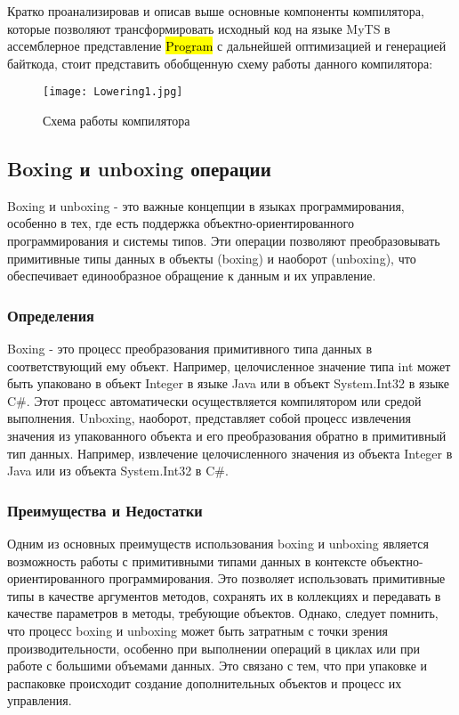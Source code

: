 Кратко проанализировав и описав выше основные компоненты компилятора, которые позволяют трансформировать исходный код на
языке MyTS в ассемблерное представление \hl{Program} с дальнейшей оптимизацией и генерацией байткода,
стоит представить обобщенную схему работы данного компилятора:

\begin{figure}[h]
    \centering
    \texttt{[image: Lowering1.jpg]}
    \caption{Схема работы компилятора}\label{fig:figure}
\end{figure}

\subsection{Boxing и unboxing операции}

Boxing и unboxing - это важные концепции в языках программирования, особенно в тех, где есть поддержка
объектно-ориентированного программирования и системы типов.
Эти операции позволяют преобразовывать примитивные типы данных в объекты (boxing) и наоборот (unboxing), что
обеспечивает единообразное обращение к данным и их управление.

\subsubsection{Определения}

Boxing - это процесс преобразования примитивного типа данных в соответствующий ему объект.
Например, целочисленное значение типа int может быть упаковано в объект Integer в языке Java или в объект
System.Int32 в языке C\#.
Этот процесс автоматически осуществляется компилятором или средой выполнения.
Unboxing, наоборот, представляет собой процесс извлечения значения из упакованного объекта и его преобразования
обратно в примитивный тип данных.
Например, извлечение целочисленного значения из объекта Integer в Java или из объекта System.Int32 в C\#.

\subsubsection{Преимущества и Недостатки}

Одним из основных преимуществ использования boxing и unboxing является возможность работы с примитивными типами данных
в контексте объектно-ориентированного программирования.
Это позволяет использовать примитивные типы в качестве аргументов методов, сохранять их в коллекциях и передавать в
качестве параметров в методы, требующие объектов.
Однако, следует помнить, что процесс boxing и unboxing может быть затратным с точки зрения производительности, особенно
при выполнении операций в циклах или при работе с большими объемами данных.
Это связано с тем, что при упаковке и распаковке происходит создание дополнительных объектов и процесс их управления.

